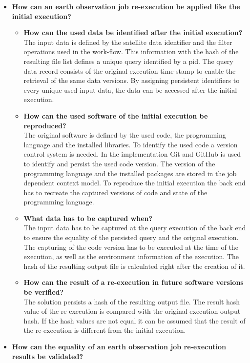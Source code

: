 \documentclass[draft,final]{vutinfth} %
\begin{document}
\begin{itemize}
	\item \textbf{How can an earth observation job re-execution be applied like the initial execution?}
	\begin{itemize}
		\item \textbf{How can the used data be identified after the initial execution?} \\
		The input data is defined by the satellite data identifier and the filter operations used in the work-flow. This information with the hash of the resulting file list defines a unique query identified by a pid. The query data record consists of the original execution time-stamp to enable the retrieval of the same data versions. By assigning persistent identifiers to every unique used input data, the data can be accessed after the initial execution.    
		\item \textbf{How can the used software of the initial execution be reproduced?} \\
		The original software is defined by the used code, the programming language and the installed libraries. To identify the used code a version control system is needed. In the implementation Git and GitHub is used to identify and persist the used code version. The version of the programming language and the installed packages are stored in the job dependent context model. To reproduce the initial execution the back end has to recreate the captured versions of code and state of the programming language.       
		\item \textbf{What data has to be captured when?} \\
		The input data has to be captured at the query execution of the back end to ensure the equality of the persisted query and the original execution. The capturing of the code version has to be executed at the time of the execution, as well as the environment information of the execution. The hash of the resulting output file is calculated right after the creation of it.  
		\item \textbf{How can the result of a re-execution in future software versions be verified?} \\
		The solution persists a hash of the resulting output file. The result hash value of the re-execution is compared with the original execution output hash. If the hash values are not equal it can be assumed that the result of the re-execution is different from the initial execution. 
	\end{itemize}
	\item \textbf{How can the equality of an earth observation job re-execution results be validated?}

\end{itemize}
\end{document}
